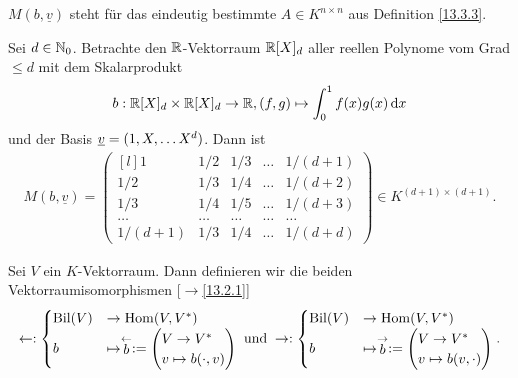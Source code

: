 \documentclass[../../main.tex]{subfiles}
\begin{document}
\begin{nt}\label{13.3.5}  
	$M(b,\underline{v})$ steht für das eindeutig bestimmte $A\in K^{n\times n}$ aus Definition \ref{13.3.3}.
\end{nt}

\begin{bsp}\label{13.3.6}
	Sei $d\in \mathbb N_0$. Betrachte den $\mathbb R$-Vektorraum $\mathbb R[X]_d$ aller reellen Polynome vom Grad $\le d$ mit dem Skalarprodukt
	\begin{align*}
		b: \mathbb R[X]_d\times \mathbb R[X]_d\to \mathbb R, (f,g)\mapsto \int_0^1 f(x)g(x)\,\text{d}x
	\end{align*}
	und der Basis ${\underline v}=(1,X,\ldots X^d)$. Dann ist
	\begin{align*}
		M(b,\underline{v})=\begin{pmatrix*}[l]
			1& 1/2& 1/3&\ldots &1/(d+1)\\
			1/2 &1/3& 1/4&\ldots &1/(d+2)\\
			1/3& 1/4& 1/5&\ldots &1/(d+3)\\
			\ldots  &\ldots & \ldots &\ldots &\ldots \\
			1/(d+1) &1/3& 1/4&\ldots &1/(d+d)
		\end{pmatrix*}\in K^{(d+1)\times(d+1)}.
	\end{align*}
\end{bsp}
	
\begin{df}\label{13.3.7}
	Sei $V$ ein $K$-Vektorraum. Dann definieren wir die beiden Vektorraumisomorphismen [$\to$\ref{13.2.1}] 
	\begin{align*}
		\leftarrow: \begin{cases}\Bil(V)&\to\Hom(V,V^*)\\b&\mapsto \lvec b:=\begin{pmatrix*}[l]V\to V^*\\ v\mapsto b(\cdot, v)\end{pmatrix*}\end{cases} \;\text{und}\;
		\rightarrow: \begin{cases}\Bil(V)&\to\Hom(V,V^*)\\b&\mapsto \rvec b:=\begin{pmatrix*}[l]V\to V^*\\ v\mapsto b(v, \cdot)\end{pmatrix*}\end{cases}.
	\end{align*}
\end{df}
\end{document}
